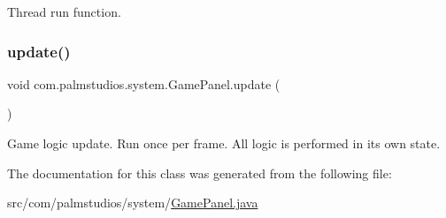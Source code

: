Thread run function. \mbox{\label{classcom_1_1palmstudios_1_1system_1_1_game_panel_a6d924afc5751fefc2701c8351d97003e}} 
\subsubsection{\texorpdfstring{update()}{update()}}
{\footnotesize\ttfamily void com.\+palmstudios.\+system.\+Game\+Panel.\+update (\begin{DoxyParamCaption}{ }\end{DoxyParamCaption})}

Game logic update. Run once per frame. All logic is performed in it\textquotesingle{}s own state. 

The documentation for this class was generated from the following file\+:\begin{DoxyCompactItemize}
\item 
src/com/palmstudios/system/\hyperlink{_game_panel_8java}{Game\+Panel.\+java}\end{DoxyCompactItemize}
